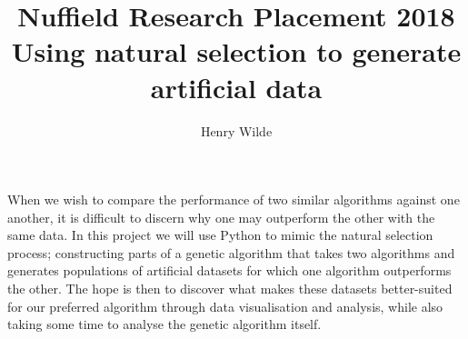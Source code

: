 \documentclass{article}
\title{
    \textbf{Nuffield Research Placement 2018} \\
    Using natural selection to generate artificial data
}
\author{Henry Wilde}
\begin{document}
\maketitle

When we wish to compare the performance of two similar algorithms against one
another, it is difficult to discern why one may outperform the other with the
same data. In this project we will use Python to mimic the natural selection
process; constructing parts of a genetic algorithm that takes two algorithms and
generates populations of artificial datasets for which one algorithm outperforms
the other. The hope is then to discover what makes these datasets better-suited
for our preferred algorithm through data visualisation and analysis, while also
taking some time to analyse the genetic algorithm itself.
\end{document}
